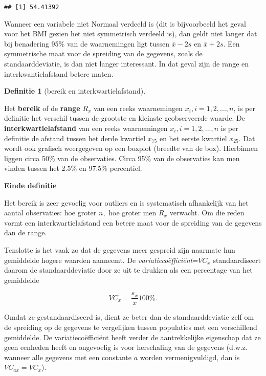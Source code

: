 \documentclass[
  12pt,dutch,coursenotes]{book}
\theoremstyle{definition}
\newtheorem{definition}{Definitie}[chapter]
\theoremstyle{definition}
\theoremstyle{definition}
\theoremstyle{remark}
\begin{document}
\begin{verbatim}
## [1] 54.41392
\end{verbatim}

Wanneer een variabele niet Normaal verdeeld is (dit is bijvoorbeeld het
geval voor het BMI gezien het niet symmetrisch verdeeld is), dan
geldt niet langer dat bij benadering 95\% van de waarnemingen ligt tussen \(\bar{x} - 2 s\) en \(\bar{x} + 2 s\). Een symmetrische maat voor de spreiding
van de gegevens, zoals de standaarddeviatie, is dan niet langer interessant.
In dat geval zijn de range en interkwantielafstand betere maten.

\begin{definition}[bereik en interkwartielafstand]
\protect\hypertarget{def:unnamed-chunk-103}{}{\label{def:unnamed-chunk-103} \iffalse (bereik en interkwartielafstand) \fi{} }
\end{definition}
Het \textbf{bereik} of de \textbf{range} \(R_x\) van een reeks waarnemingen \(x_i, i=1,2,...,n\), is per definitie het verschil tussen de grootste en
kleinste geobserveerde waarde. De \textbf{interkwartielafstand} van een
reeks waarnemingen \(x_i, i=1,2,...,n\) is per definitie de afstand tussen het derde kwartiel \(x_{75}\) en het eerste kwartiel \(x_{25}\). Dat wordt ook grafisch weergegeven op een boxplot (breedte van de box). Hierbinnen liggen circa 50\% van de observaties. Circa 95\% van de observaties kan men vinden tussen het 2.5\% en 97.5\% percentiel.

\textbf{Einde definitie}

Het bereik is zeer gevoelig voor outliers en is systematisch afhankelijk van
het aantal observaties: hoe groter \(n,\) hoe groter men \(R_x\) verwacht. Om
die reden vormt een interkwartielafstand een betere maat voor de spreiding
van de gegevens dan de range.

Tenslotte is het vaak zo dat de gegevens meer gespreid zijn naarmate hun
gemiddelde hogere waarden aanneemt. De \emph{variatiecoëfficiënt}=\(VC_x\)
standaardiseert daarom de standaarddeviatie door ze uit te drukken als een
percentage van het gemiddelde

\begin{equation*}
VC_x = \frac{s_x}{\bar{x}} 100\%.
\end{equation*}

Omdat ze gestandaardiseerd is, dient ze beter dan de standaarddeviatie zelf om de spreiding op de gegevens te vergelijken tussen populaties met een verschillend gemiddelde. De variatiecoëfficiënt heeft verder de aantrekkelijke eigenschap dat ze geen eenheden heeft en ongevoelig is
voor herschaling van de gegevens (d.w.z. wanneer alle gegevens met een
constante \(a\) worden vermenigvuldigd, dan is \(VC_{ax}=VC_x\)).
\end{document}
